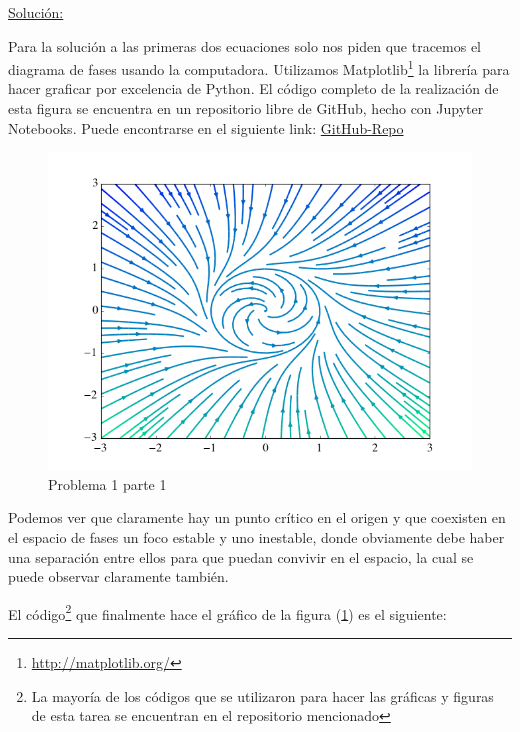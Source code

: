\documentclass[a4paper,10pt]{article}
\begin{document}
\vspace{.3cm}

\underline{Solución:}

Para la solución a las primeras dos ecuaciones solo nos piden que tracemos el diagrama
de fases usando la computadora. Utilizamos Matplotlib\footnote{\href{http://matplotlib.org/}{http://matplotlib.org/}} la librería para hacer graficar 
por excelencia de Python. El código completo de la realización de esta figura se encuentra
en un repositorio libre de GitHub, hecho con Jupyter Notebooks. Puede encontrarse en el
siguiente link: \href{https://github.com/FavioVazquez/MecanicaClasica-PCF/blob/master/Tarea2/Tarea2\%20-\%20Problema1.ipynb}{GitHub-Repo}

\begin{figure}[ht]
 \centering
\includegraphics[scale=0.5]{problema1fig1}
\caption{Problema 1 parte 1}
\label{fig:problema1fig1}
\end{figure}


\vspace{.3cm}

Podemos ver que claramente hay un punto crítico en el origen y que coexisten 
en el espacio de fases un foco estable y uno inestable, donde obviamente debe haber
una separación entre ellos para que puedan convivir en el espacio, la cual se puede
observar claramente también.

\vspace{.3cm}

El código\footnote{La mayoría de los códigos que se utilizaron para hacer
las gráficas y figuras de esta tarea se encuentran en el repositorio 
mencionado} que finalmente hace el gráfico de la figura (\ref{fig:problema1fig1}) es el siguiente:
\end{document}

